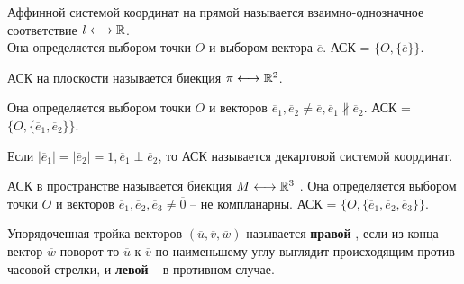 


	\Header

	\BeginConspect


	

	\begin{Def}
		Аффинной системой координат на прямой называется взаимно-однозначное соответствие $l \longleftrightarrow \mathbb{R}$. \\
		
		Она определяется выбором точки $O$  и выбором вектора $\overline{e}$. АСК = $\{O, \{\overline{e}\}\}$.
	\end{Def}

	\begin{figure}[h]
		\centering
		\def\svgwidth{0.3\columnwidth}
		
	\end{figure}

	\begin{Def}
		АСК на плоскости называется биекция $\pi \longleftrightarrow \mathbb{R}^2$. 

		Она определяется выбором точки $O$ и векторов $\overline{e}_1, \overline{e}_2 \neq \overline{e}, \overline{e}_1 \not\parallel \overline{e}_2$. 
		АСК = $\{O, \{\overline{e}_1, \overline{e}_2\}\}$.
	\end{Def}

	\begin{figure}[h]
		\centering
		\def\svgwidth{0.3\columnwidth}
		
	\end{figure}

	\begin{Def}
		Если $|\overline{e}_1| = |\overline{e}_2| = 1, \overline{e}_1 \perp \overline{e}_2$, то АСК называется декартовой системой координат. 
	\end{Def}

	\begin{Def}
		АСК в пространстве называется биекция $M \longleftrightarrow \mathbb{R}^3$ .
		Она определяется выбором точки $O$ и векторов $\overline{e}_1, \overline{e}_2, \overline{e}_3 \neq \overline{0}$ -- не компланарны. АСК = $\{O, \{\overline{e}_1, \overline{e}_2, \overline{e}_3\}\}$.
	\end{Def}

	\begin{Def}
		Упорядоченная тройка векторов $(\overline{u}, \overline{v}, \overline{w})$ называется \textbf{правой} , 
		если из конца вектор $\overline{w}$ поворот то $\overline{u}$ к $\overline{v}$ по наименьшему углу выглядит происходящим против часовой стрелки,
		и \textbf{левой} -- в противном случае. 
	\end{Def}

